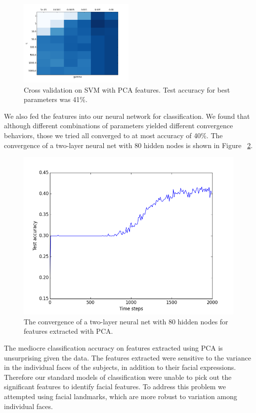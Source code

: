 \documentclass[10pt, twocolumn, twoside]{article}
\begin{document}
\begin{figure}[!htbp]
\centering
\includegraphics[width=0.5\textwidth]{grid_search_pca}
\caption{\label{fig:grid_pca} Cross validation on SVM with PCA features.
Test accuracy for best parameters was 41\%.}
\end{figure}

We also fed the features into our neural network for classification. We found that
although different combinations of parameters yielded different convergence behaviors,
those we tried all converged to at most accuracy of 40\%. The convergence of a
two-layer neural net with 80 hidden nodes is shown in Figure ~\ref{fig:pca_nnet}.

\begin{figure}[!htbp]
\centering
\includegraphics[width=\linewidth]{pca_nn_accuracy}
\caption{\label{fig:pca_nnet} The convergence of a two-layer neural net with 80
hidden nodes for features extracted with PCA.}
\end{figure}

The mediocre classification accuracy on features extracted using PCA is unsurprising
given the data. The features extracted were sensitive to the variance in the
individual faces of the subjects, in addition to their facial expressions. Therefore
our standard models of classification were unable to pick out the significant
features to identify facial features. To address this problem we attempted using
facial landmarks, which are more robust to variation among individual faces.
\end{document}
